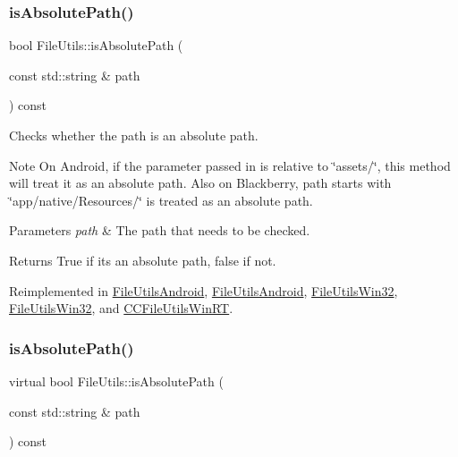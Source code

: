 \subsubsection{\texorpdfstring{is\+Absolute\+Path()}{isAbsolutePath()}\hspace{0.1cm}{\footnotesize\ttfamily [1/2]}}
{\footnotesize\ttfamily bool File\+Utils\+::is\+Absolute\+Path (\begin{DoxyParamCaption}\item[{const std\+::string \&}]{path }\end{DoxyParamCaption}) const\hspace{0.3cm}{\ttfamily [virtual]}}

Checks whether the path is an absolute path.

\begin{DoxyNote}{Note}
On Android, if the parameter passed in is relative to \char`\"{}assets/\char`\"{}, this method will treat it as an absolute path. Also on Blackberry, path starts with \char`\"{}app/native/\+Resources/\char`\"{} is treated as an absolute path.
\end{DoxyNote}

\begin{DoxyParams}{Parameters}
{\em path} & The path that needs to be checked. \\
\hline
\end{DoxyParams}
\begin{DoxyReturn}{Returns}
True if it\textquotesingle{}s an absolute path, false if not. 
\end{DoxyReturn}


Reimplemented in \hyperlink{classFileUtilsAndroid_ad13d954ba9ae2de51754965842134652}{File\+Utils\+Android}, \hyperlink{classFileUtilsAndroid_aa2d3fbd2b0938439a329a0df42ef0faa}{File\+Utils\+Android}, \hyperlink{classFileUtilsWin32_ab4ecf27c8feb35aee8894ca39d559fd7}{File\+Utils\+Win32}, \hyperlink{classFileUtilsWin32_a3427cbefa54f21aedd22ef5253a3bb46}{File\+Utils\+Win32}, and \hyperlink{classCCFileUtilsWinRT_a25ecf188d3b1724cfa64e040d2a93f7b}{C\+C\+File\+Utils\+Win\+RT}.

\mbox{\label{classFileUtils_a1c8144d857ca750585e585b53f6b5d7f}} 
\subsubsection{\texorpdfstring{is\+Absolute\+Path()}{isAbsolutePath()}\hspace{0.1cm}{\footnotesize\ttfamily [2/2]}}
{\footnotesize\ttfamily virtual bool File\+Utils\+::is\+Absolute\+Path (\begin{DoxyParamCaption}\item[{const std\+::string \&}]{path }\end{DoxyParamCaption}) const\hspace{0.3cm}{\ttfamily [virtual]}}

